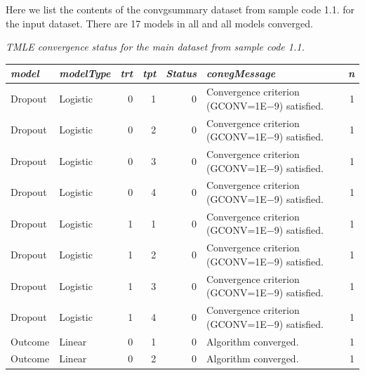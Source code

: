 \documentclass[10pt]{article}
\renewcommand{\baselinestretch}{1.3}
\begin{document}
Here we list the contents of the convgsummary dataset from sample code 1.1. for the input dataset.  There are 17 models in all and all models converged.
\vspace{0.5in}

\begin{minipage}{\textwidth}
\noindent%
{\renewcommand{\baselinestretch}{1.0}\selectfont
\begin{minipage}[l]{5.6in}
\normalsize\em%
TMLE convergence status for the main dataset from sample code 1.1.\\
\end{minipage}}\vspace{-0.11in}%
 
{\renewcommand{\baselinestretch}{1.25}\selectfont\footnotesize\selectfont\noindent%
\noindent%
\begin{tabular}{|l|l|r|r|r|l|r|}\hline
\em   model & \em    modelType & \em    trt & \em    tpt & \em    Status & \em    convgMessage & \em    n\\\hline
   Dropout &    Logistic &    0 &    1 &            0 &    Convergence criterion (GCONV=1E$-$9) satisfied. &            1\\\hline
   Dropout &    Logistic &    0 &    2 &            0 &    Convergence criterion (GCONV=1E$-$9) satisfied. &            1\\\hline
   Dropout &    Logistic &    0 &    3 &            0 &    Convergence criterion (GCONV=1E$-$9) satisfied. &            1\\\hline
   Dropout &    Logistic &    0 &    4 &            0 &    Convergence criterion (GCONV=1E$-$9) satisfied. &            1\\\hline
   Dropout &    Logistic &    1 &    1 &            0 &    Convergence criterion (GCONV=1E$-$9) satisfied. &            1\\\hline
   Dropout &    Logistic &    1 &    2 &            0 &    Convergence criterion (GCONV=1E$-$9) satisfied. &            1\\\hline
   Dropout &    Logistic &    1 &    3 &            0 &    Convergence criterion (GCONV=1E$-$9) satisfied. &            1\\\hline
   Dropout &    Logistic &    1 &    4 &            0 &    Convergence criterion (GCONV=1E$-$9) satisfied. &            1\\\hline
   Outcome &    Linear &    0 &    1 &            0 &    Algorithm converged. &            1\\\hline
   Outcome &    Linear &    0 &    2 &            0 &    Algorithm converged. &            1\\\hline

\end{tabular}}
\end{minipage}
\end{document}

